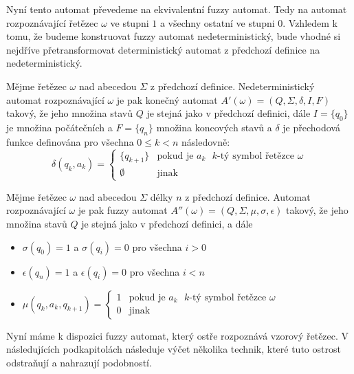 \documentclass[a4paper,10pt]{article}
\begin{document}
Nyní tento automat převedeme na ekvivalentní fuzzy automat. Tedy na automat rozpoznávající řetězec $\omega$ ve stupni $1$ a všechny ostatní ve stupni $0$. Vzhledem k tomu, že budeme konstruovat fuzzy automat nedeterministický, bude vhodné si nejdříve přetransformovat deterministický automat z předchozí definice na nedeterministický.

\begin{definition}
  Mějme řetězec $\omega$ nad abecedou $\Sigma$ z předchozí definice. Nedeterministický automat rozpoznávající $\omega$ je pak konečný automat $A'(\omega) = ( Q, \Sigma, \delta, I, F )$ takový, že jeho množina stavů $Q$ je stejná jako v předchozí definici, dále $I = \{ q_0 \}$ je množina počátečních a $F = \{ q_n \}$ množina koncových stavů a $\delta$ je přechodová funkce definována pro všechna $0 \leq k < n$ následovně:
  $$
  \delta(q_{k}, a_k) = 
  \begin{cases}
      \{ q_{k+1} \}	&\text{pokud je $a_k$ $k$-tý symbol řetězce $\omega$} \\
      \emptyset	&\text{jinak}
  \end{cases}
  $$
\end{definition}


\begin{definition}\label{def-FuzzAutRozpOme}
  Mějme řetězec $\omega$ nad abecedou $\Sigma$ délky $n$ z předchozí definice. Automat rozpoznávající $\omega$ je pak fuzzy automat $A''(\omega) = ( Q, \Sigma, \mu, \sigma, \epsilon )$ takový, že jeho množina stavů $Q$ je stejná jako v předchozí definici, a dále
  \begin{itemize}
   \item $\sigma(q_0) = 1$ a $\sigma(q_i) = 0$ pro všechna $i > 0$
   \item $\epsilon(q_n) = 1$ a $\epsilon(q_i) = 0$ pro všechna $i < n$
   \item $\mu(q_{k}, a_k, q_{k+1}) = 
      \begin{cases}
	1		&\text{pokud je $a_k$ $k$-tý symbol řetězce $\omega$} \\
	0		&\text{jinak}
      \end{cases}
      $
  \end{itemize}
\end{definition}

Nyní máme k dispozici fuzzy automat, který ostře rozpoznává vzorový řetězec. V následujících podkapitolách následuje výčet několika technik, které tuto ostrost odstraňují a nahrazují podobností.
\end{document}
